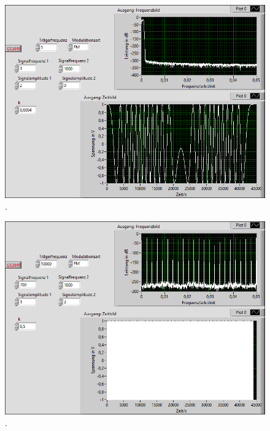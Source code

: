 \documentclass[
a4paper,
12pt,
pagesize,
ngerman
]{scrartcl}
\begin{document}
	\begin{figure}[h]
		\centering
		\includegraphics[width=1.0\textwidth]{EIRE2018Dateien/Tag4/FMPM-Erzeugung/FM-FMPM-Erzeugungp}
		\caption{.}
	\end{figure}

	\begin{figure}[h]
		\centering
		\includegraphics[width=1.0\textwidth]{EIRE2018Dateien/Tag4/FMPM-Erzeugung/anderekbei10000Traegerfr/FM-FMPM-Erzeugungp}
		\caption{.}
	\end{figure}
\end{document}
